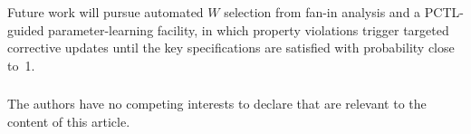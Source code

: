 \documentclass[runningheads]{llncs}
\begin{document}
Future work will pursue automated $W$ selection from fan-in analysis and a
PCTL-guided parameter-learning facility, in which property violations trigger
targeted corrective updates until the key specifications are satisfied with
probability close to~1.


\begin{credits}
\subsubsection{\discintname}
The authors have no competing interests to declare that are relevant to the
content of this article.
\end{credits}




\end{document}
